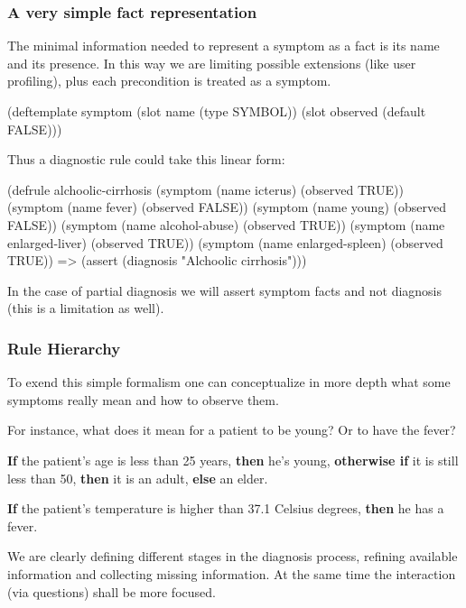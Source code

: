 \documentclass[xcolor={usenames,dvipsnames,svgnames}, compress]{beamer}
\begin{document}
\begin{frame}[fragile]
  \frametitle{A very simple fact representation}
  The minimal information needed to represent a symptom as a fact is
  its name and its presence. In this way we are limiting possible
  extensions (like user profiling), plus each precondition is treated
  as a symptom.
  \begin{clips-code}[numbers=none]
    (deftemplate symptom
        (slot name (type SYMBOL))
        (slot observed (default FALSE)))
  \end{clips-code}

  Thus a diagnostic rule could take this linear form:
  \begin{clips-code}[numbers=none]
    (defrule alchoolic-cirrhosis
        (symptom (name icterus) (observed TRUE))
        (symptom (name fever) (observed FALSE))
        (symptom (name young) (observed FALSE))
        (symptom (name alcohol-abuse) (observed TRUE))
        (symptom (name enlarged-liver) (observed TRUE))
        (symptom (name enlarged-spleen) (observed TRUE))
        =>
        (assert (diagnosis "Alchoolic cirrhosis")))
  \end{clips-code}
  
  In the case of partial diagnosis we will assert symptom facts and
  not diagnosis (this is a limitation as well).
\end{frame}

\begin{frame}
  \frametitle{Rule Hierarchy}
  To exend this simple formalism one can conceptualize in more depth
  what some symptoms really mean and how to observe them.\par\bigskip

  For instance, what does it mean for a  patient to be young? Or to
  have the fever?\par\bigskip
  \textbf{If} the patient's age is less than 25 years, \textbf{then} he's young, \textbf{otherwise if}
  it is still less than 50, \textbf{then} it is an adult, \textbf{else} an
  elder.\par
  \textbf{If} the patient's temperature is higher than 37.1 Celsius degrees,
  \textbf{then} he has a fever.\par \bigskip

  

  We are clearly defining different stages in the diagnosis process,
  refining available information and collecting missing
  information. At the same time the interaction (via questions) shall
  be more focused.\par
   
\end{frame}
\end{document}
